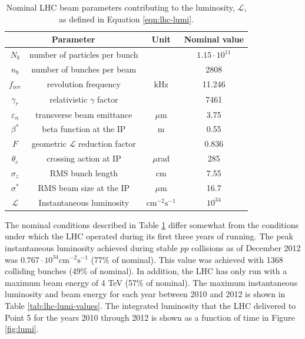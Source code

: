 \begin{table}
  \centering
  \begin{tabular}{c|c|c|c}
    \multicolumn{2}{c|}{Parameter} & Unit & Nominal value \\ 
    \hline\hline
    $N_b$ & number of particles per bunch & & $1.15 \cdot 10^{11}$ \\
    $n_b$ & number of bunches per beam & & 2808 \\ 
    $f_\text{rev}$ & revolution frequency & kHz & 11.246 \\
    $\gamma_r$ & relativistic $\gamma$ factor & & 7461 \\
    $\varepsilon_n$  & transverse beam emittance & $\mu$m &  3.75 \\
    $\beta^{*}$ & beta function at the IP & m & 0.55 \\
    $F$ & geometric $\mathcal{L}$ reduction factor & & 0.836 \\
    $\theta_c$ & crossing action at IP & $\mu$rad & 285 \\ 
    $\sigma_z$ & RMS bunch length & cm & 7.55 \\
    $\sigma^*$ & RMS beam size at the IP & $\mu$m & 16.7 \\ 
    \hline
    $\mathcal{L}$ & Instantaneous luminosity & $\text{cm}^{-2}\text{s}^{-1}$ & $10^{34}$ \\
  \end{tabular}
  \caption{Nominal LHC beam parameters
    contributing to the luminosity, $\mathcal{L}$,
    as defined in Equation \ref{eqn:lhc-lumi}.
    \cite{lhc-jinst}}
  \label{tab:lhc-parameters}
\end{table}

The nominal conditions described in Table \ref{tab:lhc-parameters}
differ somewhat from the conditions under which the LHC 
operated during its first three years of running.
The peak instantaneous luminosity achieved during stable $pp$ collisions as
of December 2012 was $0.767 \cdot 10^{34}\text{cm}^{-2}\text{s}^{-1}$ (77\% of nominal).
This value was achieved with 1368 colliding bunches (49\% of nominal).
In addition, the LHC has only run with a maximum beam energy of 4 TeV (57\% of nominal).
The maximum instantaneous luminosity and beam energy for each year between 2010 and 2012 is shown
in Table \ref{tab:lhc-lumi-values}.
The integrated luminosity that the LHC delivered to Point 5 for the years 2010 through 2012 is
shown as a function of time in Figure \ref{fig:lumi}.

